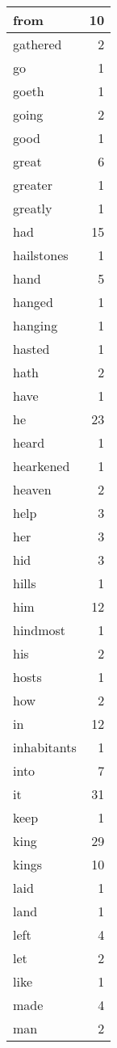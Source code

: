 \begin{center}
\begin{longtable}{l|r}
from & 10 \\ \hline
gathered & 2 \\ \hline
go & 1 \\ \hline
goeth & 1 \\ \hline
going & 2 \\ \hline
good & 1 \\ \hline
great & 6 \\ \hline
greater & 1 \\ \hline
greatly & 1 \\ \hline
had & 15 \\ \hline
hailstones & 1 \\ \hline
hand & 5 \\ \hline
hanged & 1 \\ \hline
hanging & 1 \\ \hline
hasted & 1 \\ \hline
hath & 2 \\ \hline
have & 1 \\ \hline
he & 23 \\ \hline
heard & 1 \\ \hline
hearkened & 1 \\ \hline
heaven & 2 \\ \hline
help & 3 \\ \hline
her & 3 \\ \hline
hid & 3 \\ \hline
hills & 1 \\ \hline
him & 12 \\ \hline
hindmost & 1 \\ \hline
his & 2 \\ \hline
hosts & 1 \\ \hline
how & 2 \\ \hline
in & 12 \\ \hline
inhabitants & 1 \\ \hline
into & 7 \\ \hline
it & 31 \\ \hline
keep & 1 \\ \hline
king & 29 \\ \hline
kings & 10 \\ \hline
laid & 1 \\ \hline
land & 1 \\ \hline
left & 4 \\ \hline
let & 2 \\ \hline
like & 1 \\ \hline
made & 4 \\ \hline
man & 2 \\ \hline

\end{longtable}
\end{center}
